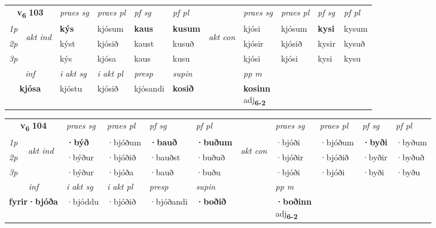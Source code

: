 \noindent
\begin{tabular}{lllllllllll} \toprule
\multicolumn{2}{c}{\textbf{v{\textsubscript{6}}} \Large{\textbf{103}}}  &  \textit{praes sg}  & \textit{praes pl}  &\textit{ pf sg} & \textit{pf pl} &  &  \textit{praes sg}  & \textit{praes pl}  & \textit{pf sg} & \textit{pf pl } \\*
	\cmidrule{3-6} \cmidrule{8-11}
 {\textit{1p}} & \multirow{3}{*}{\begin{turn}{90}\textit{akt ind}\end{turn}} & \textbf{kýs} & kjósum & \textbf{kaus} & \textbf{kusum} & \multirow{3}{*}{\begin{turn}{90}\textit{akt con}\end{turn}} &kjósi & kjósum & \textbf{kysi} & kysum\\*
 {\textit{2p}} &  &  kýst  & kjósið & kaust & kusuð & & kjósir & kjósið & kysir & kysuð \\*
{\textit{3p}} &  & kýs & kjósa & kaus & kusu & & kjósi & kjósi& kysi & kysu \\*
\cmidrule{3-6} \cmidrule{8-11}

   \multicolumn{2}{c}{\textit{inf}}  & \textit{i akt sg} & \textit{i akt pl}   & \textit{presp} & \textit{supin}  && \textit{pp m} \\*
  \multicolumn{2}{c}{\textbf{kjósa}} & kjóstu  & kjósið   & kjósandi &  \textbf{kosið}  && \specialcell{\textbf{kosinn} \\ adj\textbf{\textsubscript{6-2}}} \\*
\end{tabular}

\noindent
\begin{tabular}{lllllllllll} \toprule
\multicolumn{2}{c}{\textbf{v{\textsubscript{6}}} \Large{\textbf{104}}}  &  \textit{praes sg}  & \textit{praes pl}  &\textit{ pf sg} & \textit{pf pl} &  &  \textit{praes sg}  & \textit{praes pl}  & \textit{pf sg} & \textit{pf pl } \\*
	\cmidrule{3-6} \cmidrule{8-11}
 {\textit{1p}} & \multirow{3}{*}{\begin{turn}{90}\textit{akt ind}\end{turn}} & \textbf{·býð} & ·bjóðum & \textbf{·bauð} & \textbf{·buðum} & \multirow{3}{*}{\begin{turn}{90}\textit{akt con}\end{turn}} &·bjóði & ·bjóðum & \textbf{·byði} & ·byðum\\*
 {\textit{2p}} &  &  ·býður  & ·bjóðið & ·bauðst & ·buðuð & & ·bjóðir & ·bjóðið & ·byðir & ·byðuð \\*
{\textit{3p}} &  & ·býður & ·bjóða & ·bauð & ·buðu & & ·bjóði & ·bjóði& ·byði & ·byðu \\*
\cmidrule{3-6} \cmidrule{8-11}

   \multicolumn{2}{c}{\textit{inf}}  & \textit{i akt sg} & \textit{i akt pl}   & \textit{presp} & \textit{supin}  && \textit{pp m} \\*
  \multicolumn{2}{c}{\textbf{fyrir\allowbreak ·bjóða}} & ·bjóddu  & ·bjóðið   & ·bjóðandi &  \textbf{·boðið}  && \specialcell{\textbf{·boðinn} \\ adj\textbf{\textsubscript{6-2}}} \\*
\end{tabular}

